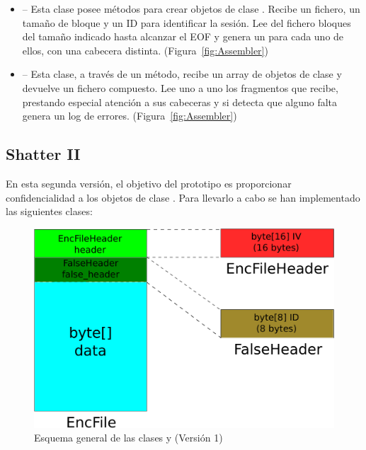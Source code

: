 \begin{itemize}
  \item {} -- Esta clase posee métodos para crear objetos de clase . Recibe un fichero, un tamaño de bloque y un ID para identificar la sesión. Lee del fichero bloques del tamaño indicado hasta alcanzar el EOF y genera un  para cada uno de ellos, con una cabecera distinta. (Figura~\ref{fig:Assembler})

  \item {} -- Esta clase, a través de un método, recibe un array de objetos de clase  y devuelve un fichero compuesto. Lee uno a uno los fragmentos que recibe, prestando especial atención a sus cabeceras y si detecta que alguno falta genera un log de errores. (Figura~\ref{fig:Assembler})
\end{itemize}

\subsection{Shatter II}

En esta segunda versión, el objetivo del prototipo es proporcionar confidencialidad a los objetos de clase . Para llevarlo a cabo se han implementado las siguientes clases:

\begin{figure}[!htb]
  \centering
  \includegraphics[scale=0.4]{Figures/EncFile_Header_1}
  \decoRule
  \caption[ -  (Versión 1)]{Esquema general de las clases  y  (Versión 1)}
  \label{fig:EncFile_Header_1}
\end{figure}


